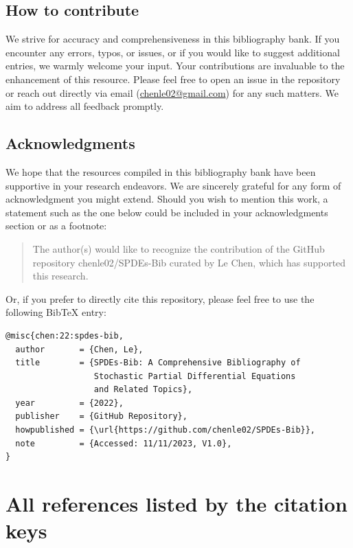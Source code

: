 \documentclass[a4paper,11pt]{article}
\begin{document}
\subsection{How to contribute}

We strive for accuracy and comprehensiveness in this bibliography bank. If you
encounter any errors, typos, or issues, or if you would like to suggest
additional entries, we warmly welcome your input. Your contributions are
invaluable to the enhancement of this resource. Please feel free to open an
issue in the repository or reach out directly via email
(\url{chenle02@gmail.com}) for any such matters. We aim to address all feedback
promptly.

\subsection{Acknowledgments}

We hope that the resources compiled in this bibliography bank have been
supportive in your research endeavors. We are sincerely grateful for any form of
acknowledgment you might extend. Should you wish to mention this work, a
statement such as the one below could be included in your acknowledgments
section or as a footnote:

\begin{quotation}
  The author(s) would like to recognize the contribution of the GitHub
  repository chenle02/SPDEs-Bib curated by Le Chen, which has supported this
  research.
\end{quotation}

Or, if you prefer to directly cite this repository, please feel free
to use the following BibTeX entry:

\begin{verbatim}
@misc{chen:22:spdes-bib,
  author       = {Chen, Le},
  title        = {SPDEs-Bib: A Comprehensive Bibliography of
                  Stochastic Partial Differential Equations
                  and Related Topics},
  year         = {2022},
  publisher    = {GitHub Repository},
  howpublished = {\url{https://github.com/chenle02/SPDEs-Bib}},
  note         = {Accessed: 11/11/2023, V1.0},
}
\end{verbatim}

\newpage
\section{All references listed by the citation keys}

\citeall
\end{document}

